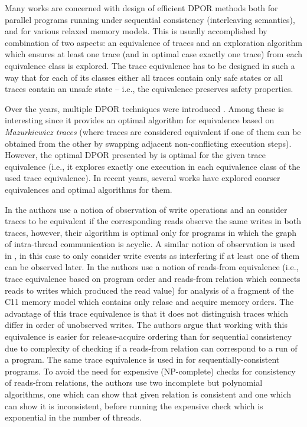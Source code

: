 Many works are concerned with design of efficient DPOR methods both for
parallel programs running under sequential consistency (interleaving
semantics), and for various relaxed memory models.
This is usually accomplished by combination of two aspects: an equivalence of
traces and an exploration algorithm which ensures at least one trace (and in
optimal case exactly one trace) from each equivalence class is explored.
The trace equivalence has to be designed in such a way that for each of its
classes either all traces contain only safe states or all traces contain an
unsafe state -- i.e., the equivalence preserves safety properties.

Over the years, multiple DPOR techniques were introduced
.
Among these  is interesting since it provides an optimal algorithm for equivalence based on \emph{Mazurkiewicz traces}  (where traces are considered equivalent if one of them can be obtained from the other by swapping adjacent non-conflicting execution steps).
However, the optimal DPOR presented by  is optimal for the
given trace equivalence (i.e., it explores exactly one execution in each equivalence class of the used trace equivalence).
In recent years, several works have explored coarser equivalences and optimal algorithms for them.

In  the authors use a notion of observation of write operations and an consider traces to be equivalent if the corresponding reads observe the same writes in both traces, however, their algorithm is optimal only for programs in which the graph of intra-thread communication is acyclic.
A similar notion of observation is used in , in this case to only consider write events as interfering if at least one of them can be observed later.
In  the authors use a notion of reads-from equivalence (i.e., trace equivalence based on program order and reads-from relation which connects reads to writes which produced the read value) for analysis of a fragment of the C11 memory model which contains only relase and acquire memory orders.
The advantage of this trace equivalence is that it does not distinguish traces which differ in order of unobserved writes.
The authors argue that working with this equivalence is easier for release-acquire ordering than for sequential consistency due to complexity of checking if a reads-from relation can correspond to a run of a program.
The same trace equivalence is used in  for sequentially-consistent programs.
To avoid the need for expensive (NP-complete) checks for consistency of reads-from relations, the authors use two incomplete but polynomial algorithms, one which can show that given relation is consistent and one which can show it is inconsistent, before running the expensive check which is exponential in the number of threads.

